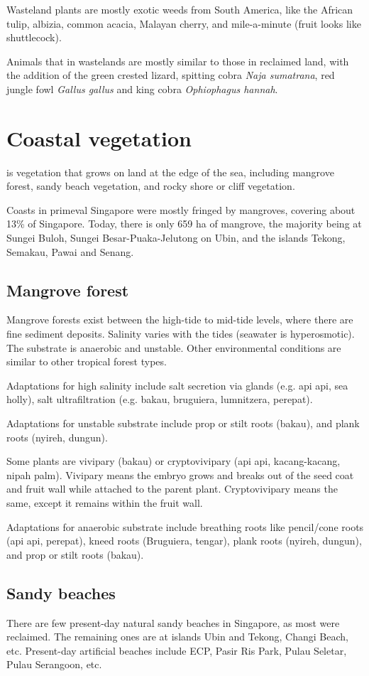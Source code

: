 \documentclass{slnotes}
\newcommand{\scn}[1]{\textit{#1}}
\begin{document}
Wasteland plants are mostly exotic weeds from South America, like the African tulip, albizia, common acacia, Malayan cherry, and mile-a-minute (fruit looks like shuttlecock).

Animals that in wastelands are mostly similar to those in reclaimed land, with the addition of the green crested lizard, spitting cobra \scn{Naja sumatrana}, red jungle fowl \scn{Gallus gallus} and king cobra \scn{Ophiophagus hannah}.
\chapter{Coastal vegetation}
 is vegetation that grows on land at the edge of the sea, including mangrove forest, sandy beach vegetation, and rocky shore or cliff vegetation.

Coasts in primeval Singapore were mostly fringed by mangroves, covering about 13\% of Singapore. Today, there is only 659 ha of mangrove, the majority being at Sungei Buloh, Sungei Besar-Puaka-Jelutong on Ubin, and the islands Tekong, Semakau, Pawai and Senang.
\section{Mangrove forest}
Mangrove forests exist between the high-tide to mid-tide levels, where there are fine sediment deposits. Salinity varies with the tides (seawater is hyperosmotic). The substrate is anaerobic and unstable. Other environmental conditions are similar to other tropical forest types.

Adaptations for high salinity include salt secretion via glands (e.g. api api, sea holly), salt ultrafiltration (e.g. bakau, bruguiera, lumnitzera, perepat).

Adaptations for unstable substrate include prop or stilt roots (bakau), and plank roots (nyireh, dungun).

Some plants are vivipary (bakau) or cryptovivipary (api api, kacang-kacang, nipah palm). Vivipary means the embryo grows and breaks out of the seed coat and fruit wall while attached to the parent plant. Cryptovivipary means the same, except it remains within the fruit wall.

Adaptations for anaerobic substrate include breathing roots like pencil/cone roots (api api, perepat), kneed roots (Bruguiera, tengar), plank roots (nyireh, dungun), and prop or stilt roots (bakau).
\section{Sandy beaches}
There are few present-day natural sandy beaches in Singapore, as most were reclaimed. The remaining ones are at islands Ubin and Tekong, Changi Beach, etc. Present-day artificial beaches include ECP, Pasir Ris Park, Pulau Seletar, Pulau Serangoon, etc.
\end{document}
